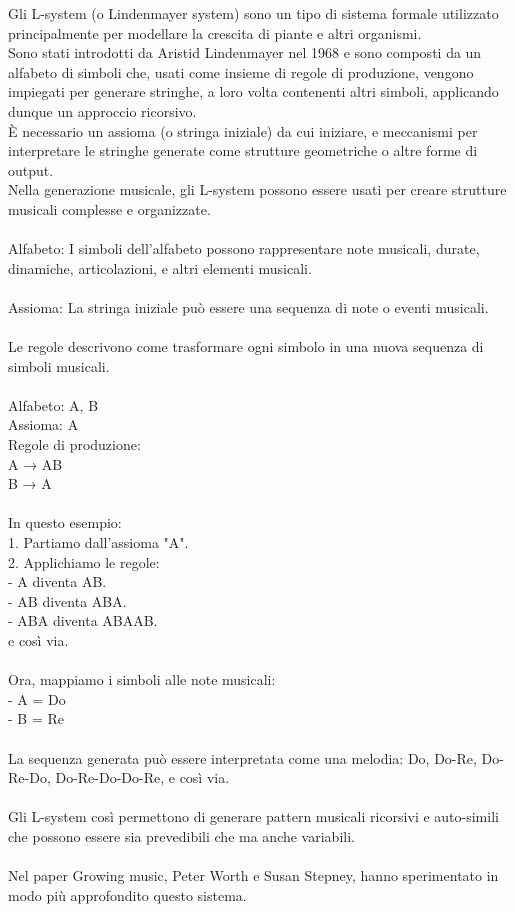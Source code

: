\documentclass[a4paper,12pt]{report}
\begin{document}
Gli L-system (o Lindenmayer system) sono un tipo di sistema formale utilizzato principalmente per modellare la crescita di piante e altri organismi. \\
Sono stati introdotti da Aristid Lindenmayer nel 1968 e sono composti da un alfabeto di simboli che, usati come insieme di regole di produzione, vengono impiegati per generare stringhe, a loro volta contenenti altri simboli, applicando dunque un approccio ricorsivo. \\
È necessario un assioma (o stringa iniziale) da cui iniziare, e meccanismi per interpretare le stringhe generate come strutture geometriche o altre forme di output. \\
Nella generazione musicale, gli L-system possono essere usati per creare strutture musicali complesse e organizzate. \\
\\
Alfabeto: I simboli dell'alfabeto possono rappresentare note musicali, durate, dinamiche, articolazioni, e altri elementi musicali. \\
\\
Assioma: La stringa iniziale può essere una sequenza di note o eventi musicali. \\
\\
Le regole descrivono come trasformare ogni simbolo in una nuova sequenza di simboli musicali. \\
\\
Alfabeto: {A, B} \\
Assioma: A \\
Regole di produzione: \\
  A → AB \\
  B → A \\
\\
In questo esempio: \\
1. Partiamo dall'assioma "A". \\
2. Applichiamo le regole: \\
   - A diventa AB. \\
   - AB diventa ABA. \\
   - ABA diventa ABAAB. \\
   e così via. \\
\\
Ora, mappiamo i simboli alle note musicali: \\
- A = Do \\
- B = Re \\
\\
La sequenza generata può essere interpretata come una melodia: Do, Do-Re, Do-Re-Do, Do-Re-Do-Do-Re, e così via. \\
\\
Gli L-system così permettono di generare pattern musicali ricorsivi e auto-simili che possono essere sia prevedibili che ma anche variabili. \\
\\
Nel paper Growing music, Peter Worth e Susan Stepney, hanno sperimentato in modo più approfondito questo sistema. \\
\end{document}
